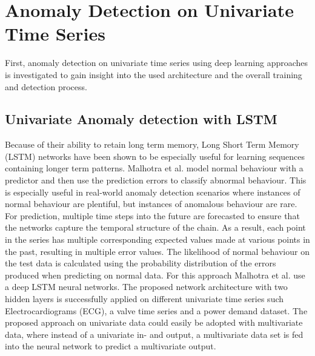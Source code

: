 %
%
%
%

\section{Anomaly Detection on Univariate Time Series} \label{Anomaly Detection on Univariate Time Series}

First, anomaly detection on univariate time series using deep learning approaches is investigated to gain insight into the used architecture and the overall training and detection process. 

\subsection{Univariate Anomaly detection with LSTM}

Because of their ability to retain long term memory, Long Short Term Memory (LSTM) networks have been shown to be especially useful for learning sequences containing longer term patterns. Malhotra et al. \parencite*{Malhotra2015} model normal behaviour with a predictor and then use the prediction errors to classify abnormal behaviour. This is especially useful in real-world anomaly detection scenarios where instances of normal behaviour are plentiful, but instances of anomalous behaviour are rare. For prediction, multiple time steps into the future are forecasted to ensure that the networks capture the temporal structure of the chain. As a result, each point in the series has multiple corresponding expected values made at various points in the past, resulting in multiple error values. The likelihood of normal behaviour on the test data is calculated using the probability distribution of the errors produced when predicting on normal data. For this approach Malhotra et al. \parencite{Malhotra2015} use a deep LSTM neural networks. The proposed network architecture with two hidden layers is successfully applied on different univariate time series such Electrocardiograms (ECG), a valve time series and a power demand dataset. The proposed approach on univariate data could easily be adopted with multivariate data, where instead of a univariate in- and output, a multivariate data set is fed into the neural network to predict a multivariate output. 


